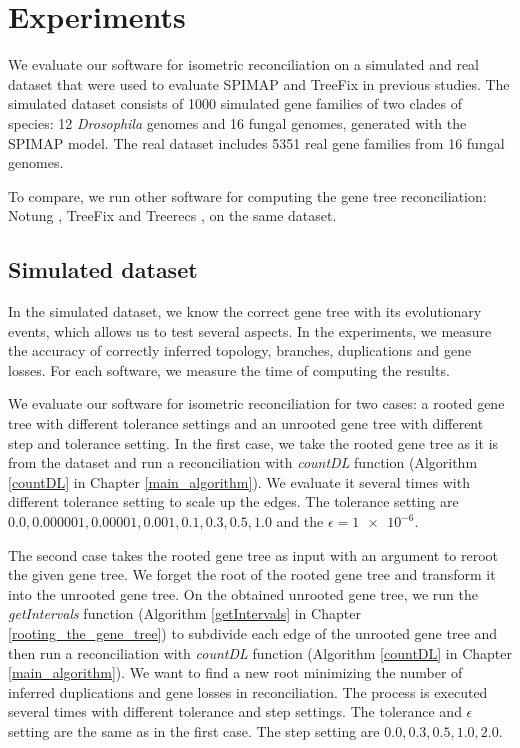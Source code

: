 \chapter{Experiments}

We evaluate our software for isometric reconciliation on a simulated and real dataset that were used to evaluate SPIMAP \cite{spimap} and TreeFix \cite{treefix} in previous studies. The simulated dataset consists of 1000 simulated gene families of two clades of species: 12 \emph{Drosophila} genomes and 16 fungal genomes, generated with the SPIMAP model. The real dataset includes 5351 real gene families from 16 fungal genomes.

To compare, we run other software for computing the gene tree reconciliation: Notung \cite{notung}, TreeFix \cite{treefix} and Treerecs \cite{treerecs}, on the same dataset.

\section{Simulated dataset}

In the simulated dataset, we know the correct gene tree with its evolutionary events, which allows us to test several aspects. In the experiments, we measure the accuracy of correctly inferred topology, branches, duplications and gene losses. For each software, we measure the time of computing the results. 

We evaluate our software for isometric reconciliation for two cases: a rooted gene tree with different tolerance settings and an unrooted gene tree with different step and tolerance setting. In the first case, we take the rooted gene tree as it is from the dataset and run a reconciliation with \emph{countDL} function (Algorithm \ref{countDL} in Chapter \ref{main_algorithm}). We evaluate it several times with different tolerance setting to scale up the edges. The tolerance setting are $0.0, 0.000001, 0.00001, 0.001, 0.1, 0.3, 0.5, 1.0$ and the $\epsilon = \num{1e-6}$.

The second case takes the rooted gene tree as input with an argument to reroot the given gene tree. We forget the root of the rooted gene tree and transform it into the unrooted gene tree. On the obtained unrooted gene tree, we run the \emph{getIntervals} function (Algorithm \ref{getIntervals} in Chapter \ref{rooting_the_gene_tree}) to subdivide each edge of the unrooted gene tree and then run a reconciliation with \emph{countDL} function (Algorithm \ref{countDL} in Chapter \ref{main_algorithm}). We want to find a new root minimizing the number of inferred duplications and gene losses in reconciliation. The process is executed several times with different tolerance and step settings. The tolerance and $\epsilon$ setting are the same as in the first case. The step setting are $0.0, 0.3, 0.5, 1.0, 2.0$.

